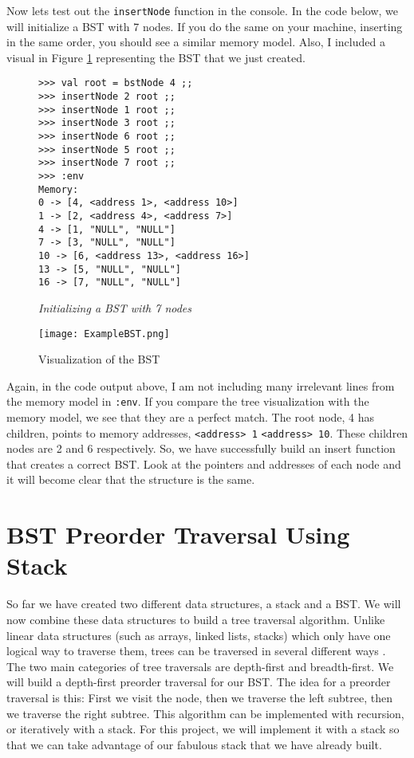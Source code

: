 \documentclass{article}
\begin{document}
\medskip\noindent
Now lets test out the \texttt{insertNode} function in the console. In the code below, we will initialize a BST with 7 nodes. If you do the same on your machine, inserting in the same order, you should see a similar memory model. Also, I included a visual in Figure \ref{fig:bst-visualization} representing the BST that we just created.

\begin{figure}[H]
    \begin{lstlisting}
>>> val root = bstNode 4 ;;
>>> insertNode 2 root ;;
>>> insertNode 1 root ;;
>>> insertNode 3 root ;;
>>> insertNode 6 root ;;
>>> insertNode 5 root ;;
>>> insertNode 7 root ;;
>>> :env
Memory:
0 -> [4, <address 1>, <address 10>]
1 -> [2, <address 4>, <address 7>]
4 -> [1, "NULL", "NULL"]
7 -> [3, "NULL", "NULL"]
10 -> [6, <address 13>, <address 16>]
13 -> [5, "NULL", "NULL"]
16 -> [7, "NULL", "NULL"]
    \end{lstlisting}
    \caption{\textit{Initializing a BST with 7 nodes}}
\end{figure}


\begin{figure}[H]
    \centering
    \texttt{[image: ExampleBST.png]}
    \caption{Visualization of the BST}
    \label{fig:bst-visualization}
\end{figure}

\noindent
Again, in the code output above, I am not including many irrelevant lines from the memory model in \texttt{:env}. If you compare the tree visualization with the memory model, we see that they are a perfect match. The root node, 4 has children, points to memory addresses, \texttt{<address> 1} \texttt{<address> 10}. These children nodes are 2 and 6 respectively. So, we have successfully build an insert function that creates a correct BST. Look at the pointers and addresses of each node and it will become clear that the structure is the same. 

\section{BST Preorder Traversal Using Stack}

\medskip\noindent
So far we have created two different data structures, a stack and a BST. We will now combine these data structures to build a tree traversal algorithm. Unlike linear data structures (such as arrays, linked lists, stacks) which only have one logical way to traverse them, trees can be traversed in several different ways \cite{GFG}. The two main categories of tree traversals are depth-first and breadth-first. We will build a depth-first preorder traversal for our BST. The idea for a preorder traversal is this: First we visit the node, then we traverse the left subtree, then we traverse the right subtree. This algorithm can be implemented with recursion, or iteratively with a stack. For this project, we will implement it with a stack so that we can take advantage of our fabulous stack that we have already built. 
\end{document}
